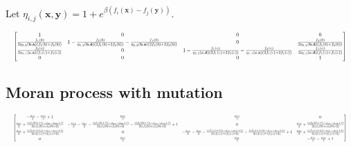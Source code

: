 \documentclass{article}
\begin{document}
Let \(\eta_{i,j}(\mathbf{x}, \mathbf{y}) = 1 + e^{\beta(f_i(\mathbf{x}) - f_j(\mathbf{y}))}\).
\begin{center}
\begin{equation}
\resizebox{\textwidth}{!}{$
\begin{bmatrix}
1 & 0 & 0 & 0\\
\frac{f_{1}(b)}{2\eta_{2,2}(\mathbf{b},\mathbf{a})(f_{1}(b)+f_{2}(b))} &
1 - \frac{f_{2}(b)}{\eta_{1,1}(\mathbf{b},\mathbf{d})(2f_{1}(b)+2f_{2}(b))}
  - \frac{f_{1}(b)}{\eta_{2,2}(\mathbf{b},\mathbf{a})(2f_{1}(b)+2f_{2}(b))} &
0 &
\frac{f_{2}(b)}{2\eta_{1,1}(\mathbf{b},\mathbf{d})(f_{1}(b)+f_{2}(b))}\\
\frac{f_{2}(c)}{2\eta_{1,1}(\mathbf{c},\mathbf{a})(f_{1}(c)+f_{2}(c))} &
0 &
1 - \frac{f_{1}(c)}{\eta_{2,2}(\mathbf{c},\mathbf{d})(2f_{1}(c)+2f_{2}(c))}
  - \frac{f_{2}(c)}{\eta_{1,1}(\mathbf{c},\mathbf{a})(2f_{1}(c)+2f_{2}(c))} &
\frac{f_{1}(c)}{2\eta_{2,2}(\mathbf{c},\mathbf{d})(f_{1}(c)+f_{2}(c))}\\
0 & 0 & 0 & 1
\end{bmatrix}$}
\label{eqn:2x2_IID_Transition}
\end{equation}
\end{center}

\subsection*{Moran process with mutation}
\begin{equation}
\resizebox{\textwidth}{!}{$
\begin{bmatrix}
-\frac{\mu_{12}}{2} - \frac{\mu_{22}}{2} + 1 &
\frac{\mu_{22}}{2} &
\frac{\mu_{12}}{2} &
0\\[0.5em]
\frac{\mu_{21}}{2}
+ \frac{(\epsilon f_{1}(b) + 1)(-\mu_{21} - \mu_{22} + 1)}
       {2(\epsilon f_{1}(b) + \epsilon f_{2}(b) + 2)}
&
-\frac{\mu_{12}}{2} - \frac{\mu_{21}}{2}
- \frac{(\epsilon f_{1}(b) + 1)(-\mu_{21} - \mu_{22} + 1)}
       {2(\epsilon f_{1}(b) + \epsilon f_{2}(b) + 2)}
- \frac{(\epsilon f_{2}(b) + 1)(-\mu_{11} - \mu_{12} + 1)}
       {2(\epsilon f_{1}(b) + \epsilon f_{2}(b) + 2)}
+ 1 &
0 &
\frac{\mu_{12}}{2}
+ \frac{(\epsilon f_{2}(b) + 1)(-\mu_{11} - \mu_{12} + 1)}
       {2(\epsilon f_{1}(b) + \epsilon f_{2}(b) + 2)}\\[0.5em]
\frac{\mu_{11}}{2}
+ \frac{(\epsilon f_{2}(c) + 1)(-\mu_{11} - \mu_{12} + 1)}
       {2(\epsilon f_{1}(c) + \epsilon f_{2}(c) + 2)}
& 0 &
-\frac{\mu_{11}}{2} - \frac{\mu_{22}}{2}
- \frac{(\epsilon f_{1}(c) + 1)(-\mu_{21} - \mu_{22} + 1)}
       {2(\epsilon f_{1}(c) + \epsilon f_{2}(c) + 2)}
- \frac{(\epsilon f_{2}(c) + 1)(-\mu_{11} - \mu_{12} + 1)}
       {2(\epsilon f_{1}(c) + \epsilon f_{2}(c) + 2)}
+ 1 &
\frac{\mu_{22}}{2}
+ \frac{(\epsilon f_{1}(c) + 1)(-\mu_{21} - \mu_{22} + 1)}
       {2(\epsilon f_{1}(c) + \epsilon f_{2}(c) + 2)}\\[0.5em]
0 & \frac{\mu_{11}}{2} & \frac{\mu_{21}}{2} &
-\frac{\mu_{11}}{2} - \frac{\mu_{21}}{2} + 1
\end{bmatrix}$}
\label{eqn:2x2_Moran_Mutation_Transition}
\end{equation}
\end{document}
